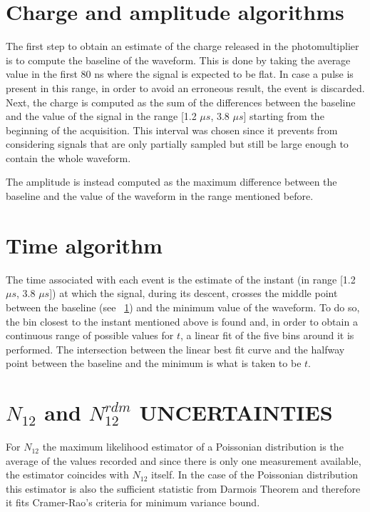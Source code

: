 \documentclass[10pt,a4paper,twocolumn]{article}
\begin{document}
\clearpage
\begin{appendices}
\section{Charge and amplitude algorithms}\label{appendix:c_a_algorithm}
The first step to obtain an estimate of the charge released in the photomultiplier is to compute the baseline of the waveform. This is done by taking the average value in the first 80 ns where the signal is expected to be flat. In case a pulse is present in this range, in order to avoid an erroneous result, the event is discarded. Next, the charge is computed as the sum of the differences between the baseline and the value of the signal in the range [1.2 $\mu s$, 3.8 $\mu s$] starting from the beginning of the acquisition. This interval was chosen since it prevents from considering signals that are only partially sampled but still be large enough to contain the whole waveform. 

The amplitude is instead computed as the maximum difference between the baseline and the value of the waveform in the range mentioned before.

\section{Time algorithm}\label{appendix:t_algorithm}
The time associated with each event is the estimate of the instant (in range [1.2 $\mu s$, 3.8 $\mu s$]) at which the signal, during its descent, crosses the middle point between the baseline (see \appendixname~\ref{appendix:c_a_algorithm}) and the minimum value of the waveform. To do so, the bin closest to the instant mentioned above is found and, in order to obtain a continuous range of possible values for $t$, a linear fit of the five bins around it is performed. The intersection between the linear best fit curve and the halfway point between the baseline and the minimum is what is taken to be $t$.

\section{$N_{12}$ and $N^{rdm}_{12}$ UNCERTAINTIES}\label{appendix:N_uncertainties}


For $N_{12}$ the maximum likelihood estimator of a Poissonian distribution is the average of the values recorded and since there is only one measurement available, the estimator coincides with $N_{12}$ itself. In the case of the Poissonian distribution this estimator is also the sufficient statistic from Darmois Theorem and therefore it fits Cramer-Rao's criteria for minimum variance bound.


\end{appendices}
\end{document}
